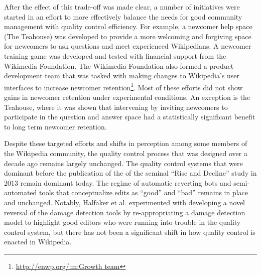 After the effect of this trade-off was made clear, a number of initiatives were started in an effort to more effectively balance the needs for good community management with quality control efficiency.  For example, a newcomer help space (The Teahouse\cite{morgan2013tea}) was developed to provide a more welcoming and forgiving space for newcomers to ask questions and meet experienced Wikipedians.  A newcomer training game was developed and tested with financial support from the Wikimedia Foundation\cite{narayan2015effects}.  The Wikimedia Foundation also formed a product development team that was tasked with making changes to Wikipedia's user interfaces to increase newcomer retention\footnote{\url{http://enwp.org/:m:Growth team}}.  Most of these efforts did not show gains in newcomer retention under experimental conditions.  An exception is the Teahouse, where it was shown that intervening by inviting newcomers to participate in the question and answer space had a statistically significant benefit to long term newcomer retention\cite{morgan2018evaluating}.

Despite these targeted efforts and shifts in perception among some members of the Wikipedia community, the quality control process that was designed over a decade ago remains largely unchanged\cite{halfaker2014snuggle}.  The quality control systems that were dominant before the publication of the of the seminal ``Rise and Decline'' study in 2013\cite{halfaker2013rise} remain dominant today.  The regime of automatic reverting bots and semi-automated tools that conceptualize edits as ``good'' and ``bad'' remains in place and unchanged.  Notably, Halfaker et al. experimented with developing a novel reversal of the damage detection tools by re-appropriating a damage detection model to highlight good editors who were running into trouble in the quality control system\cite{halfaker2014snuggle}, but there has not been a significant shift in how quality control is enacted in Wikipedia.

